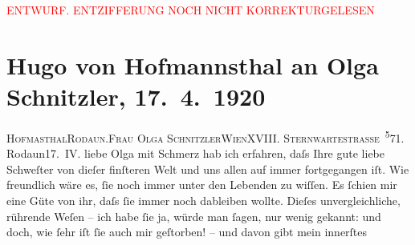 
\begin{center}
            \textcolor{red}{ENTWURF. ENTZIFFERUNG NOCH NICHT KORREKTURGELESEN}
                      \end{center}
            
               \section[Hugo von Hofmannsthal an Olga Schnitzler, 17. 4. 1920]{ Hugo von Hofmannsthal an Olga Schnitzler, 17. 4. 1920}\nopagebreak{}\rehead{ }\begin{ledgroupsized}[t]{13cm}\normalsize\beginnumbering{} \toendnotes[C]{\smallbreak\pagebreak[2]} 
\toendnotes[C]{\smallbreak}\pstart{}{\pb}\textsc{Hofma{\geminationn}sthal}\pend{}\pstart{}\textsc{Rodaun.}\pend{}{\bigskip}\pstart{}\textsc{Frau Olga Schnitzler}\pend{}\pstart{}\textsc{Wien}\pend{}\pstart{}\textsc{XVIII. Sternwartestrasse \substVorne{}\textsuperscript{5}\substDazwischen{}7\substHinten{}1.}\pend{}{\bigskip}\pstart
           \raggedleft{}{\pb}Rodaun17. IV.\pend
           \pstart{}liebe Olga\pend\pstart
           mit Schmerz hab ich erfahren, daſs Ihre gute liebe Schweſter von dieſer finſteren Welt und uns allen auf immer
               fortgegangen iſt. Wie freundlich wäre es, ſie noch immer unter den Lebenden zu
               wiſſen. Es ſchien mir eine Güte von ihr, daſs ſie immer noch dableiben wollte. Dieſes
               unvergleichliche, rührende Weſen
               – ich habe ſie ja, {\pb}würde man ſagen, nur wenig
               gekannt: und doch, wie ſehr iſt ſie auch mir geſtorben! – und davon gibt mein innerſtes

\end{ledgroupsized}
